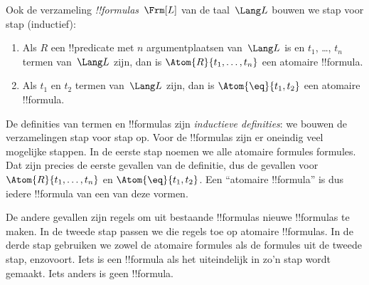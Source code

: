 \documentclass[openany]{memoir}
\begin{document}
\begin{defn}[Formules]
Ook de verzameling \emph{!!{formula}s}~$\Frm[L]$ van de taal~$\Lang L$
bouwen we stap voor stap (inductief):
\begin{enumerate}


\item Als $R$ een !!{predicate} met $n$ argumentplaatsen van~$\Lang L$
  is en $t_1$, \dots, $t_n$ termen van~$\Lang L$ zijn, dan is
  $\Atom{R}{t_1,\ldots, t_n}$ een atomaire !!{formula}.

\item Als $t_1$ en $t_2$ termen van~$\Lang L$ zijn, dan is
  $\Atom{\eq}{t_1, t_2}$ een atomaire !!{formula}.








\end{enumerate}
\end{defn}

\begin{explain}
De definities van termen en !!{formula}s zijn \emph{inductieve
definities}: we bouwen de verzamelingen stap voor stap op. Voor de
!!{formula}s zijn er oneindig veel mogelijke stappen. In de eerste
stap noemen we alle atomaire formules formules. Dat zijn precies de
eerste gevallen van de definitie, dus de gevallen voor
%
%
$\Atom{R}{t_1,\dots,t_n}$ en $\Atom{\eq}{t_1,t_2}$. Een ``atomaire
!!{formula}'' is dus iedere !!{formula} van een van deze vormen.

De andere gevallen zijn regels om uit bestaande !!{formula}s nieuwe
!!{formula}s te maken. In de tweede stap passen we die regels toe op
atomaire !!{formula}s. In de derde stap gebruiken we zowel de atomaire
formules als de formules uit de tweede stap, enzovoort. Iets is een
!!{formula} als het uiteindelijk in zo'n stap wordt gemaakt. Iets
anders is geen !!{formula}.
\end{explain}
\end{document}
